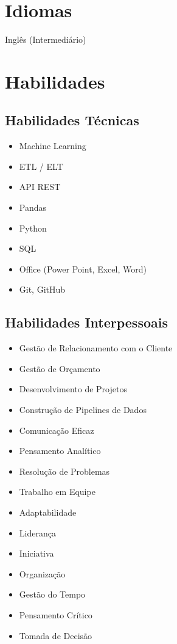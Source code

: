 \documentclass[a4paper,10pt]{article}
\begin{document}
\section*{Idiomas}
\item Inglês (Intermediário)

\section*{Habilidades}

\subsection*{Habilidades Técnicas}
\begin{itemize}[leftmargin=*]
    \item Machine Learning
    \item ETL / ELT
    \item API REST
    \item Pandas
    \item Python
    \item SQL
    \item Office (Power Point, Excel, Word)
    \item Git, GitHub

\end{itemize}

\subsection*{Habilidades Interpessoais}
\begin{itemize}[leftmargin=*]
   \item Gestão de Relacionamento com o Cliente
\item Gestão de Orçamento
\item Desenvolvimento de Projetos
\item Construção de Pipelines de Dados
\item Comunicação Eficaz
\item Pensamento Analítico
\item Resolução de Problemas
\item Trabalho em Equipe
\item Adaptabilidade
\item Liderança
\item Iniciativa
\item Organização
\item Gestão do Tempo
\item Pensamento Crítico
\item Tomada de Decisão
\end{itemize}
\end{document}
